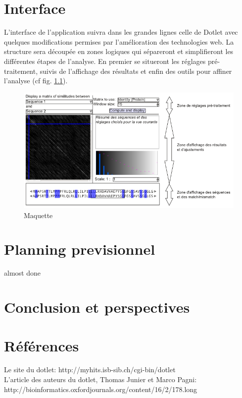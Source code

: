\documentclass{report}
\begin{document}
\chapter{Interface}
L'interface de l'application suivra dans les grandes lignes celle de Dotlet avec quelques modifications permises par l'amélioration des technologies web. La structure sera découpée en zones logiques qui sépareront et simplifieront les différentes étapes de l'analyse. En premier se situeront les réglages pré-traitement, suivis de l'affichage des résultats et enfin des outils pour affiner l'analyse (cf fig. \ref{maquette}).\\

\begin{figure}[!h]
\centerline{\includegraphics[scale=0.60]{maquette.png}}
\caption{Maquette}
\label{maquette}
\end{figure}

\chapter{Planning previsionnel}
almost done



\chapter*{Conclusion et perspectives}


\chapter*{Références}
Le site du dotlet: http://myhits.isb-sib.ch/cgi-bin/dotlet\\
L'article des auteurs du dotlet, Thomas Junier et Marco Pagni: http://bioinformatics.oxfordjournals.org/content/16/2/178.long\\
\end{document}
